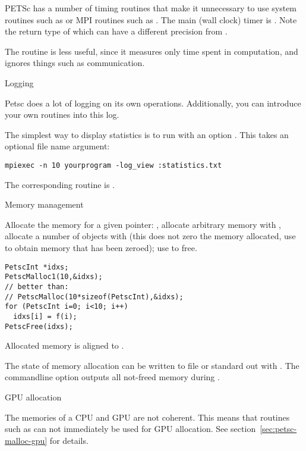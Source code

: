 PETSc has a number of timing routines that make it unnecessary to
use system routines such as 
or MPI routines such as .
The main (wall clock) timer is .
Note the return type of  which
can have a different precision from .

The routine  is less useful, since it measures only
time spent in computation, and ignores things such as communication.

 {Logging}

Petsc does a lot of logging on its own operations.
Additionally, you can introduce your own routines into this log.

The simplest way to display statistics is to run
with an option .
This takes an optional file name argument:
\begin{verbatim}
mpiexec -n 10 yourprogram -log_view :statistics.txt
\end{verbatim}
The corresponding routine is .

 {Memory management}
\label{sec:petscmalloc}

Allocate the memory for a given pointer: ,
allocate arbitrary memory with ,
allocate a number of objects with 
(this does not zero the memory allocated,
 use  to obtain memory that has been zeroed);
use  to free.
\begin{lstlisting}
PetscInt *idxs;
PetscMalloc1(10,&idxs);
// better than:
// PetscMalloc(10*sizeof(PetscInt),&idxs);
for (PetscInt i=0; i<10; i++)
  idxs[i] = f(i);
PetscFree(idxs);
\end{lstlisting}
Allocated memory is aligned to .

The state of memory allocation can be written to file or standard out
with . The commandline option
 outputs all not-freed memory during
.

 {GPU allocation}

The memories of a CPU and GPU are not coherent.
This means that routines such as 
can not immediately be used for GPU allocation.
See section~\ref{sec:petsc-malloc-gpu} for details.
